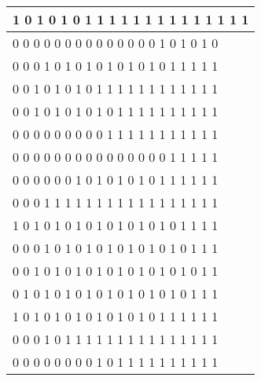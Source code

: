 \documentclass[11pt, a4paper]{article}
\begin{document}
\begin{enumerate}
\begin{table}[http]
\begin{tabular}{|l|}
			1     0     1     0     1     0     1     1     1     1     1     1     1     1     1     1     1     1     1     1 \\ \hline
			0     0     0     0     0     0     0     0     0     0     0     0     0     0     1     0     1     0     1     0 \\ \hline
			0     0     0     1     0     1     0     1     0     1     0     1     0     1     0     1     1     1     1     1 \\ \hline
			0     0     1     0     1     0     1     0     1     1     1     1     1     1     1     1     1     1     1     1 \\ \hline
			0     0     1     0     1     0     1     0     1     0     1     1     1     1     1     1     1     1     1     1 \\ \hline
			0     0     0     0     0     0     0     0     0     1     1     1     1     1     1     1     1     1     1     1 \\ \hline
			0     0     0     0     0     0     0     0     0     0     0     0     0     0     0     1     1     1     1     1 \\ \hline
			0     0     0     0     0     0     1     0     1     0     1     0     1     0     1     1     1     1     1     1 \\ \hline
			0     0     0     1     1     1     1     1     1     1     1     1     1     1     1     1     1     1     1     1 \\ \hline
			1     0     1     0     1     0     1     0     1     0     1     0     1     0     1     0     1     1     1     1 \\ \hline
			0     0     0     1     0     1     0     1     0     1     0     1     0     1     0     1     0     1     1     1 \\ \hline
			0     0     1     0     1     0     1     0     1     0     1     0     1     0     1     0     1     0     1     1 \\ \hline
			0     1     0     1     0     1     0     1     0     1     0     1     0     1     0     1     0     1     1     1 \\ \hline
			1     0     1     0     1     0     1     0     1     0     1     0     1     0     1     1     1     1     1     1 \\ \hline
			0     0     0     1     0     1     1     1     1     1     1     1     1     1     1     1     1     1     1     1 \\ \hline
			0     0     0     0     0     0     0     0     1     0     1     1     1     1     1     1     1     1     1     1 \\ \hline

\end{tabular}
\end{table}
\end{enumerate}
\end{document}

